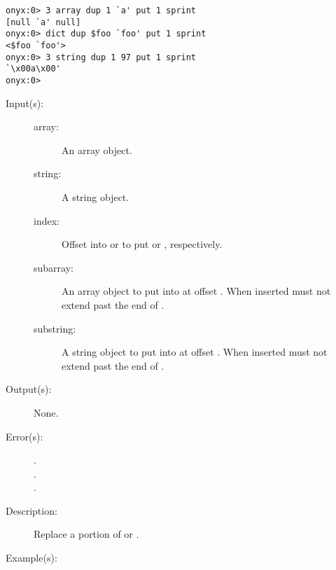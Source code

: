 \begin{description}
\begin{description}
\begin{verbatim}
onyx:0> 3 array dup 1 `a' put 1 sprint
[null `a' null]
onyx:0> dict dup $foo `foo' put 1 sprint
<$foo `foo'>
onyx:0> 3 string dup 1 97 put 1 sprint
`\x00a\x00'
onyx:0>
		\end{verbatim}
	\end{description}
\label{systemdict:putinterval}
\item[{\onyxop{array index subarray}{putinterval}{--}}: ]
\item[{\onyxop{string index substring}{putinterval}{--}}: ]
	\begin{description}\item[]
	\item[Input(s): ]
		\begin{description}\item[]
		\item[array: ]
			An array object.
		\item[string: ]
			A string object.
		\item[index: ]
			Offset into  or  to put
			 or , respectively.
		\item[subarray: ]
			An array object to put into  at offset
			.  When inserted  must not
			extend past the end of .
		\item[substring: ]
			A string object to put into  at offset
			.  When inserted  must not
			extend past the end of .
		\end{description}
	\item[Output(s): ] None.
	\item[Error(s): ]
		\begin{description}\item[]
		\item[.]
		\item[.]
		\item[.]
		\end{description}
	\item[Description: ]
		Replace a portion of  or .
	\item[Example(s): ]\begin{verbatim}


\end{verbatim}
\end{description}
\end{description}
